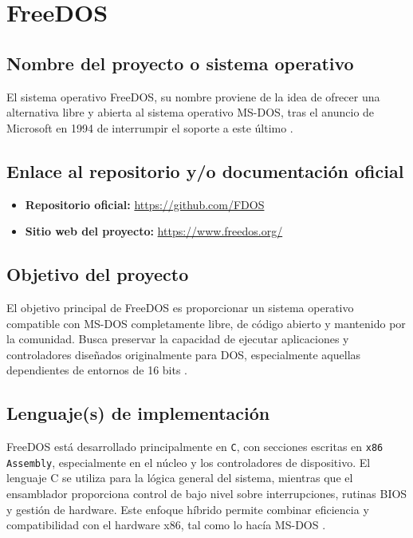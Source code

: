 \section{FreeDOS}

\subsection{Nombre del proyecto o sistema operativo}
El sistema operativo FreeDOS, su nombre proviene de la idea de ofrecer una alternativa libre y abierta al sistema operativo MS-DOS, tras el anuncio de Microsoft en 1994 de interrumpir el soporte a este último \citep{freedos_home}.  

\subsection{Enlace al repositorio y/o documentación oficial}
\begin{itemize}
    \item \textbf{Repositorio oficial:} \url{https://github.com/FDOS}
    \item \textbf{Sitio web del proyecto:} \url{https://www.freedos.org/}
\end{itemize}

\subsection{Objetivo del proyecto}
El objetivo principal de FreeDOS es proporcionar un sistema operativo compatible con MS-DOS completamente libre, de código abierto y mantenido por la comunidad.  
Busca preservar la capacidad de ejecutar aplicaciones y controladores diseñados originalmente para DOS, especialmente aquellas dependientes de entornos de 16 bits \citep{freedos_home}.  

\subsection{Lenguaje(s) de implementación}
FreeDOS está desarrollado principalmente en \texttt{C}, con secciones escritas en \texttt{x86 Assembly}, especialmente en el núcleo y los controladores de dispositivo.  
El lenguaje C se utiliza para la lógica general del sistema, mientras que el ensamblador proporciona control de bajo nivel sobre interrupciones, rutinas BIOS y gestión de hardware.  
Este enfoque híbrido permite combinar eficiencia y compatibilidad con el hardware x86, tal como lo hacía MS-DOS \citep{freedos_developers}.  

